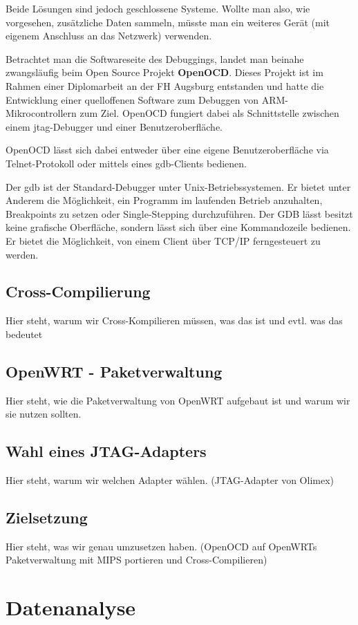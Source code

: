 Beide Lösungen sind jedoch geschlossene Systeme. Wollte man also, wie
vorgesehen, zusätzliche Daten sammeln, müsste man ein weiteres Gerät (mit
eigenem Anschluss an das Netzwerk) verwenden.

Betrachtet man die Softwareseite des Debuggings, landet man beinahe
zwangsläufig beim Open Source Projekt \textbf{OpenOCD}. Dieses Projekt ist im
Rahmen einer Diplomarbeit\cite{OOCD2} an der FH Augsburg entstanden und hatte
die Entwicklung einer quelloffenen Software zum Debuggen von
ARM-Mikrocontrollern zum Ziel. OpenOCD fungiert dabei als Schnittstelle zwischen
einem \gls{jtag}-Debugger und einer Benutzeroberfläche.

OpenOCD lässt sich dabei entweder über eine eigene Benutzeroberfläche via
Telnet-Protokoll oder mittels eines \gls{gdb}-Clients bedienen.
\begin{definition}[GDB]
Der \gls{gdb} ist der Standard-Debugger unter
Unix-Betriebssystemen. Er bietet unter Anderem die Möglichkeit, ein Programm im
laufenden Betrieb anzuhalten, Breakpoints zu setzen oder Single-Stepping
durchzuführen. Der GDB lässt besitzt keine grafische Oberfläche, sondern
lässt sich über eine Kommandozeile bedienen. Er bietet die Möglichkeit, von
einem Client über TCP/IP ferngesteuert zu werden. 
\end{definition}
\subsection{Cross-Compilierung}
Hier steht, warum wir Cross-Kompilieren müssen, was das ist und evtl. was das
bedeutet
\subsection{OpenWRT - Paketverwaltung}
Hier steht, wie die Paketverwaltung von OpenWRT aufgebaut ist und warum wir sie
nutzen sollten.
\subsection{Wahl eines JTAG-Adapters}
Hier steht, warum wir welchen Adapter wählen. (JTAG-Adapter von Olimex)
\subsection{Zielsetzung}
Hier steht, was wir genau umzusetzen haben. (OpenOCD auf OpenWRTs
Paketverwaltung mit MIPS portieren und Cross-Compilieren)
\section{Datenanalyse}

